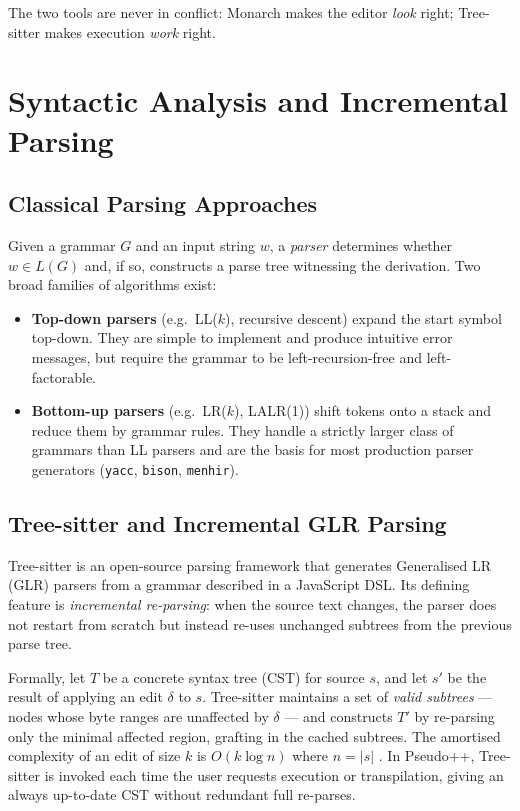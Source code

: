 The two tools are never in conflict: Monarch makes the editor \textit{look}
right; Tree-sitter makes execution \textit{work} right.

\section{Syntactic Analysis and Incremental Parsing}
\label{sec:parsing}

\subsection{Classical Parsing Approaches}

Given a grammar $G$ and an input string $w$, a \textit{parser} determines whether
$w \in L(G)$ and, if so, constructs a parse tree witnessing the derivation.  Two
broad families of algorithms exist:

\begin{itemize}
  \item \textbf{Top-down parsers} (e.g.\ LL($k$), recursive descent) expand the
        start symbol top-down.  They are simple to implement and produce intuitive
        error messages, but require the grammar to be left-recursion-free and
        left-factorable.

  \item \textbf{Bottom-up parsers} (e.g.\ LR($k$), LALR(1)) shift tokens onto a
        stack and reduce them by grammar rules.  They handle a strictly larger class
        of grammars than LL parsers and are the basis for most production parser
        generators (\texttt{yacc}, \texttt{bison}, \texttt{menhir}).
\end{itemize}

\subsection{Tree-sitter and Incremental GLR Parsing}

Tree-sitter \cite{treesitter} is an open-source parsing framework that generates
Generalised LR (GLR) parsers from a grammar described in a JavaScript DSL.  Its
defining feature is \textit{incremental re-parsing}: when the source text changes,
the parser does not restart from scratch but instead re-uses unchanged subtrees from
the previous parse tree.

Formally, let $T$ be a concrete syntax tree (CST) for source $s$, and let $s'$ be
the result of applying an edit $\delta$ to $s$.  Tree-sitter maintains a set of
\textit{valid subtrees} --- nodes whose byte ranges are unaffected by $\delta$ ---
and constructs $T'$ by re-parsing only the minimal affected region, grafting in the
cached subtrees.  The amortised complexity of an edit of size $k$ is $O(k \log n)$
where $n = |s|$ \cite{treesitter-thesis}.  In Pseudo++, Tree-sitter is invoked
each time the user requests execution or transpilation, giving an always up-to-date
CST without redundant full re-parses.

